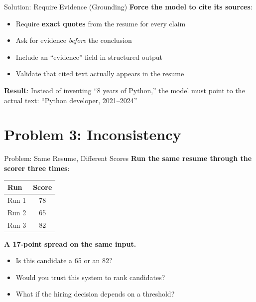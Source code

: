 \documentclass[aspectratio=169]{beamer}
\begin{document}
\begin{frame}{Solution: Require Evidence (Grounding)}
\textbf{Force the model to cite its sources}:
\vspace{0.3cm}

\begin{itemize}
    \item Require \textbf{exact quotes} from the resume for every claim
    \item Ask for evidence \textit{before} the conclusion
    \item Include an ``evidence'' field in structured output
    \item Validate that cited text actually appears in the resume
\end{itemize}
\vspace{0.3cm}

\textbf{Result}: Instead of inventing ``8 years of Python,'' the model must point to the actual text: ``Python developer, 2021--2024''
\vspace{0.3cm}

\begin{center}
\end{center}
\end{frame}

\section{Problem 3: Inconsistency}

\begin{frame}{Problem: Same Resume, Different Scores}
\textbf{Run the same resume through the scorer three times}:
\vspace{0.3cm}

\begin{center}
\begin{tabular}{l c}
\textbf{Run} & \textbf{Score} \\
\hline
Run 1 & 78 \\
Run 2 & 65 \\
Run 3 & 82 \\
\end{tabular}
\end{center}
\vspace{0.3cm}

\textbf{A 17-point spread on the same input.}
\vspace{0.2cm}

\begin{itemize}
    \item Is this candidate a 65 or an 82?
    \item Would you trust this system to rank candidates?
    \item What if the hiring decision depends on a threshold?
\end{itemize}
\end{frame}
\end{document}
